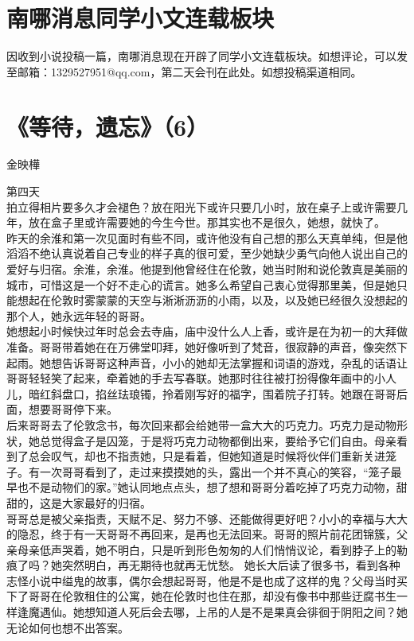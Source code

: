 \documentclass[letterpaper, 12pt]{article}
\begin{document}
\begin{multicols}{2}
\section{南哪消息同学小文连载板块}
因收到小说投稿一篇，南哪消息现在开辟了同学小文连载板块。如想评论，可以发至邮箱：1329527951@qq.com，第二天会刊在此处。如想投稿渠道相同。
\section{《等待，遗忘》（6）}
金映樺\\

\newCJKfontfamily{}\fan

第四天\\

拍立得相片要多久才会褪色？放在阳光下或许只要几小时，放在桌子上或许需要几年，放在盒子里或许需要她的今生今世。那其实也不是很久，她想，就快了。\\

昨天的余淮和第一次见面时有些不同，或许他没有自己想的那么天真单纯，但是他滔滔不绝认真说着自己专业的样子真的很可爱，至少她缺少勇气向他人说出自己的爱好与归宿。余淮，余淮。他提到他曾经住在伦敦，她当时附和说伦敦真是美丽的城市，可惜这是一个好不走心的谎言。她多么希望自己衷心觉得那里美，但是她只能想起在伦敦时雾蒙蒙的天空与淅淅沥沥的小雨，以及，以及她已经很久没想起的那个人，她永远年轻的哥哥。\\

她想起小时候快过年时总会去寺庙，庙中没什么人上香，或许是在为初一的大拜做准备。哥哥带着她在在万佛堂叩拜，她好像听到了梵音，很寂静的声音，像突然下起雨。她想告诉哥哥这种声音，小小的她却无法掌握和词语的游戏，杂乱的话语让哥哥轻轻笑了起来，牵着她的手去写春联。她那时往往被打扮得像年画中的小人儿，暗红斜盘口，掐丝珐琅镯，拎着刚写好的福字，围着院子打转。她跟在哥哥后面，想要哥哥停下来。\\

后来哥哥去了伦敦念书，每次回来都会给她带一盒大大的巧克力。巧克力是动物形状，她总觉得盒子是囚笼，于是将巧克力动物都倒出来，要给予它们自由。母亲看到了总会叹气，却也不指责她，只是看着，但她知道是时候将伙伴们重新关进笼子。有一次哥哥看到了，走过来摸摸她的头，露出一个并不真心的笑容，“笼子最早也不是动物们的家。”她认同地点点头，想了想和哥哥分着吃掉了巧克力动物，甜甜的，这是大家最好的归宿。\\

哥哥总是被父亲指责，天赋不足、努力不够、还能做得更好吧？小小的幸福与大大的隐忍，终于有一天哥哥不再回来，是再也无法回来。哥哥的照片前花团锦簇，父亲母亲低声哭着，她不明白，只是听到形色匆匆的人们悄悄议论，看到脖子上的勒痕了吗？她突然明白，再无期待也就再无忧愁。
她长大后读了很多书，看到各种志怪小说中缢鬼的故事，偶尔会想起哥哥，他是不是也成了这样的鬼？父母当时买下了哥哥在伦敦租住的公寓，她在伦敦时也住在那，却没有像书中那些迂腐书生一样逢魔遇仙。她想知道人死后会去哪，上吊的人是不是果真会徘徊于阴阳之间？她无论如何也想不出答案。\\


\end{multicols}
\end{document}

